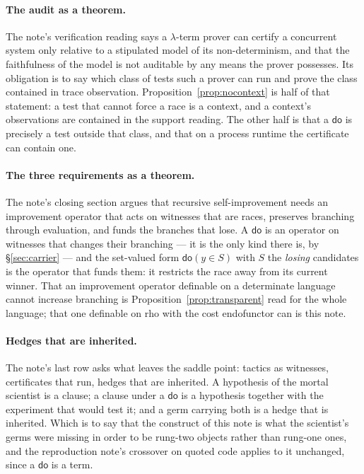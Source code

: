 \documentclass[11pt,a4paper]{article}
\theoremstyle{plain}
\theoremstyle{definition}
\theoremstyle{remark}
\newcommand{\rhoc}{\textsf{rho}}
\newcommand{\dok}{\textsf{do}}
\begin{document}
\paragraph{The audit as a theorem.} The note's verification reading says a
$\lambda$-term prover can certify a concurrent system only relative to a
stipulated model of its non-determinism, and that the faithfulness of the model
is not auditable by any means the prover possesses. Its obligation is to say
which class of tests such a prover can run and prove the class contained in
trace observation. Proposition~\ref{prop:nocontext} is half of that statement:
a test that cannot force a race is a context, and a context's observations are
contained in the support reading. The other half is that a $\dok$ is precisely
a test outside that class, and that on a process runtime the certificate can
contain one.

\paragraph{The three requirements as a theorem.} The note's closing section
argues that recursive self-improvement needs an improvement operator that acts
on witnesses that are races, preserves branching through evaluation, and funds
the branches that lose. A $\dok$ is an operator on witnesses that changes their
branching --- it is the only kind there is, by \S\ref{sec:carrier} --- and the
set-valued form $\dok(y \in S)$ with $S$ the \emph{losing} candidates is the
operator that funds them: it restricts the race away from its current winner.
That an improvement operator definable on a determinate language cannot increase
branching is Proposition~\ref{prop:transparent} read for the whole language;
that one definable on \rhoc{} with the cost endofunctor can is this note.

\paragraph{Hedges that are inherited.} The note's last row asks what leaves the
saddle point: tactics as witnesses, certificates that run, hedges that are
inherited. A hypothesis of the mortal scientist is a clause; a clause under a
$\dok$ is a hypothesis together with the experiment that would test it; and a
germ carrying both is a hedge that is inherited. Which is to say that the
construct of this note is what the scientist's germs were missing in order to
be rung-two objects rather than rung-one ones, and the reproduction note's
crossover on quoted code applies to it unchanged, since a $\dok$ is a term.
\end{document}
